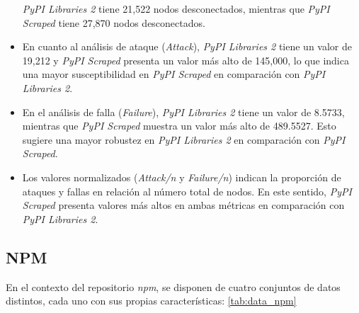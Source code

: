\begin{itemize}
          \textit{PyPI Libraries 2} tiene 21,522 nodos desconectados, mientras que \textit{PyPI Scraped} tiene 27,870 nodos desconectados.
    \item En cuanto al análisis de ataque (\textit{Attack}), \textit{PyPI Libraries 2}
          tiene un valor de 19,212 y \textit{PyPI Scraped} presenta un valor más alto de
          145,000, lo que indica una mayor susceptibilidad en \textit{PyPI Scraped} en
          comparación con \textit{PyPI Libraries 2}.
    \item En el análisis de falla (\textit{Failure}), \textit{PyPI Libraries 2} tiene un
          valor de 8.5733, mientras que \textit{PyPI Scraped} muestra un valor más alto de 489.5527.
          Esto sugiere una mayor robustez en \textit{PyPI Libraries 2} en comparación con
          \textit{PyPI Scraped}.
    \item Los valores normalizados (\textit{Attack/n} y \textit{Failure/n}) indican la
          proporción de ataques y fallas en relación al número total de nodos. En este sentido,
          \textit{PyPI Scraped} presenta valores más altos en ambas métricas en comparación con
          \textit{PyPI Libraries 2}.
\end{itemize}


\subsection{NPM}

En el contexto del repositorio \textit{npm}, se disponen de cuatro conjuntos de datos
distintos, cada uno con sus propias características: \ref{tab:data_npm}

